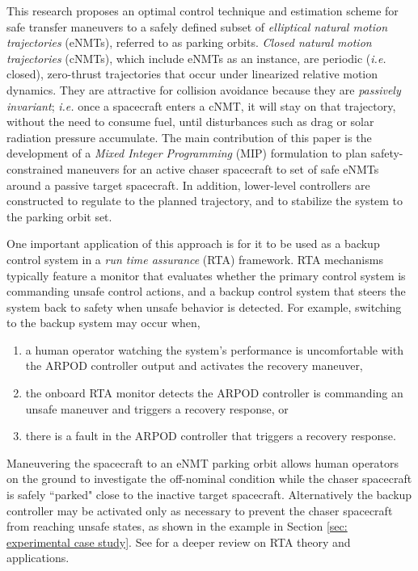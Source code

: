 \documentclass[twocolumn,letterpaper]{IEEEAerospaceCLS}  %
\theoremstyle{definition}
\begin{document}
This research proposes an optimal control technique and estimation scheme for safe transfer maneuvers to a safely defined subset of \textit{elliptical natural motion trajectories} (eNMTs),
referred to as 
parking orbits. 
\textit{Closed natural motion trajectories} (cNMTs), which include eNMTs as an instance, are periodic (\emph{i.e.} closed), zero-thrust trajectories that occur
under linearized relative motion dynamics. 
They are attractive for collision avoidance because they are \textit{passively invariant}; \emph{i.e.} once a spacecraft enters a cNMT, it will stay on that trajectory, 
without the need to consume fuel, 
until disturbances such as drag or solar radiation pressure accumulate.
The main contribution of this paper is the 
development of a \textit{Mixed Integer Programming} (MIP) 
formulation 
to plan safety-constrained maneuvers for an active chaser spacecraft 
to set of safe eNMTs around a passive target spacecraft. 
In addition, lower-level controllers are constructed to regulate to the planned trajectory, and to stabilize the system to the parking orbit set.  

One important application of this approach is for it to be used as a backup control system in a \textit{run time assurance} (RTA) framework. 
RTA mechanisms typically feature a monitor that
evaluates whether the primary control system is commanding unsafe control actions, and a backup control system that steers the system back to safety when unsafe behavior is detected. 
For example, switching to the backup system may occur when, 
\begin{enumerate}
\item a human operator watching the system's performance is uncomfortable with the ARPOD controller output and activates the recovery maneuver, 
\item the onboard RTA monitor detects the ARPOD controller is commanding an unsafe maneuver and triggers a recovery response, or 
\item there is a fault in the ARPOD controller that triggers a recovery response. 
\end{enumerate}
Maneuvering the spacecraft to an eNMT parking orbit allows human operators on the ground to investigate the off-nominal condition while the chaser spacecraft is safely ``parked" close to the inactive target spacecraft. 
Alternatively the backup controller may be activated only as necessary to prevent the chaser spacecraft from reaching unsafe states, as shown in the example in Section \ref{sec: experimental case study}. See \cite{bak2009system,seto1998dynamic,ho2017longitudinal,gurriet2020scalable,schierman2020runtime} for a deeper review on RTA theory and applications. 
\end{document}
